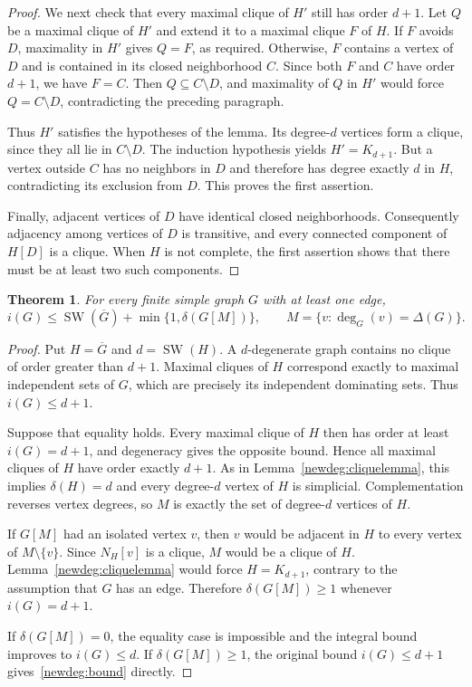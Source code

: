 \documentclass[11pt,a4paper]{article}
\newtheorem{theorem}{Theorem}[section]
\theoremstyle{remark}
\begin{document}
\begin{proof}
We next check that every maximal clique of $H'$ still has order $d+1$.
Let $Q$ be a maximal clique of $H'$ and extend it to a maximal clique $F$
of $H$.  If $F$ avoids $D$, maximality in $H'$ gives $Q=F$, as required.
Otherwise, $F$ contains a vertex of $D$ and is contained in its closed
neighborhood $C$.  Since both $F$ and $C$ have order $d+1$, we have $F=C$.
Then $Q\subseteq C\setminus D$, and maximality of $Q$ in $H'$ would force
$Q=C\setminus D$, contradicting the preceding paragraph.

Thus $H'$ satisfies the hypotheses of the lemma.  Its degree-$d$ vertices
form a clique, since they all lie in $C\setminus D$.  The induction
hypothesis yields $H'=K_{d+1}$.  But a vertex outside $C$ has no neighbors
in $D$ and therefore has degree exactly $d$ in $H$, contradicting its
exclusion from $D$.  This proves the first assertion.

Finally, adjacent vertices of $D$ have identical closed neighborhoods.
Consequently adjacency among vertices of $D$ is transitive, and every
connected component of $H[D]$ is a clique.  When $H$ is not complete, the
first assertion shows that there must be at least two such components.
\end{proof}

\begin{theorem}
\label{newdeg:main}
For every finite simple graph $G$ with at least one edge,
\begin{equation}
\label{newdeg:bound}
 i(G)\le
 \operatorname{SW}(\overline G)+\min\{1,\delta(G[M])\},
 \qquad
 M=\{v:\deg_G(v)=\Delta(G)\}.
\end{equation}
\end{theorem}

\begin{proof}
Put $H=\overline G$ and $d=\operatorname{SW}(H)$.  A $d$-degenerate graph
contains no clique of order greater than $d+1$.  Maximal cliques of $H$
correspond exactly to maximal independent sets of $G$, which are precisely
its independent dominating sets.  Thus $i(G)\le d+1$.

Suppose that equality holds.  Every maximal clique of $H$ then has order
at least $i(G)=d+1$, and degeneracy gives the opposite bound.  Hence all
maximal cliques of $H$ have order exactly $d+1$.  As in
Lemma~\ref{newdeg:cliquelemma}, this implies $\delta(H)=d$ and every
degree-$d$ vertex of $H$ is simplicial.  Complementation reverses vertex
degrees, so $M$ is exactly the set of degree-$d$ vertices of $H$.

If $G[M]$ had an isolated vertex $v$, then $v$ would be adjacent in $H$
to every vertex of $M\setminus\{v\}$.  Since $N_H[v]$ is a clique, $M$
would be a clique of $H$.  Lemma~\ref{newdeg:cliquelemma} would force
$H=K_{d+1}$, contrary to the assumption that $G$ has an edge.  Therefore
$\delta(G[M])\ge1$ whenever $i(G)=d+1$.

If $\delta(G[M])=0$, the equality case is impossible and the integral
bound improves to $i(G)\le d$.  If $\delta(G[M])\ge1$, the original bound
$i(G)\le d+1$ gives~\eqref{newdeg:bound} directly.
\end{proof}
\end{document}
